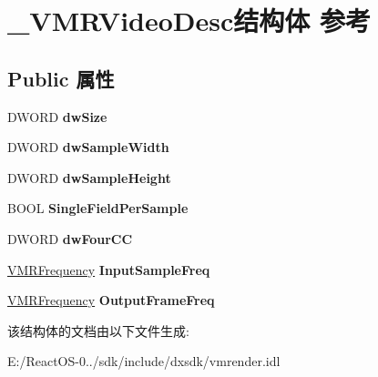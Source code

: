 \hypertarget{struct___v_m_r_video_desc}{}\section{\+\_\+\+V\+M\+R\+Video\+Desc结构体 参考}
\label{struct___v_m_r_video_desc}
\subsection*{Public 属性}
\begin{DoxyCompactItemize}
\item 
\mbox{\label{struct___v_m_r_video_desc_aac8ec7c8dc1b84409f8c6cb0462bc608}} 
D\+W\+O\+RD {\bfseries dw\+Size}
\item 
\mbox{\label{struct___v_m_r_video_desc_af4145ac0b06147f4e39294452f055812}} 
D\+W\+O\+RD {\bfseries dw\+Sample\+Width}
\item 
\mbox{\label{struct___v_m_r_video_desc_af079cea723bdec86ab3f042929cce12e}} 
D\+W\+O\+RD {\bfseries dw\+Sample\+Height}
\item 
\mbox{\label{struct___v_m_r_video_desc_aac972185cd1037a0a86e00061766c7af}} 
B\+O\+OL {\bfseries Single\+Field\+Per\+Sample}
\item 
\mbox{\label{struct___v_m_r_video_desc_abb1817ce7909849c875d48bf3f981d23}} 
D\+W\+O\+RD {\bfseries dw\+Four\+CC}
\item 
\mbox{\label{struct___v_m_r_video_desc_a046df4363e718b3569cc61720afa1e13}} 
\hyperlink{struct___v_m_r_frequency}{V\+M\+R\+Frequency} {\bfseries Input\+Sample\+Freq}
\item 
\mbox{\label{struct___v_m_r_video_desc_a81160799c4dbcacb3de166f850832314}} 
\hyperlink{struct___v_m_r_frequency}{V\+M\+R\+Frequency} {\bfseries Output\+Frame\+Freq}
\end{DoxyCompactItemize}


该结构体的文档由以下文件生成\+:\begin{DoxyCompactItemize}
\item 
E\+:/\+React\+O\+S-\/0../sdk/include/dxsdk/vmrender.\+idl\end{DoxyCompactItemize}
